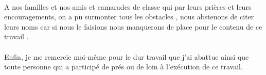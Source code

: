 \paragraph{}
A nos familles et nos amis et camarades de classe  qui par leurs prières et leurs encouragements, on a pu surmonter tous les obstacles , nous abstenons de citer leurs noms car si nous le faisions nous manquerons de place pour le contenu de ce travail .
\paragraph{}
Enfin, je  me remercie  moi-même pour le dur travail que j'ai abattue ainsi que toute personne qui a participé de prés ou de loin à l’exécution de ce travail.\\